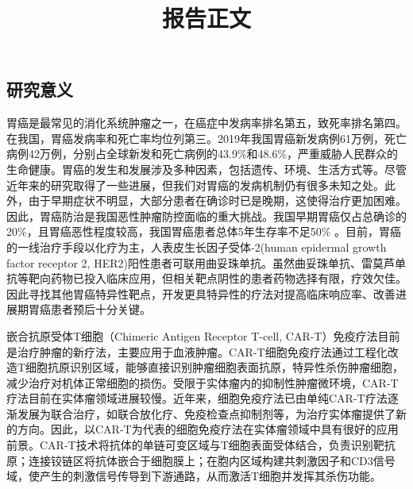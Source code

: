 \documentclass[12pt]{article}
\begin{document}

\title{报告正文}

\maketitle







\subsection{研究意义}


胃癌是最常见的消化系统肿瘤之一，在癌症中发病率排名第五，致死率排名第四。在我国，胃癌发病率和死亡率均位列第三\cite{1}。2019年我国胃癌新发病例61万例，死亡病例42万例，分别占全球新发和死亡病例的43.9\%和48.6\%\cite{2}，严重威胁人民群众的生命健康。胃癌的发生和发展涉及多种因素，包括遗传、环境、生活方式等。尽管近年来的研究取得了一些进展，但我们对胃癌的发病机制仍有很多未知之处。此外，由于早期症状不明显，大部分患者在确诊时已是晚期，这使得治疗更加困难。因此，胃癌防治是我国恶性肿瘤防控面临的重大挑战。我国早期胃癌仅占总确诊的20\%，且胃癌恶性程度较高，我国胃癌患者总体5年生存率不足50\% \cite{3}。目前，胃癌的一线治疗手段以化疗为主，人表皮生长因子受体-2(human epidermal growth factor receptor 2, HER2)阳性患者可联用曲妥珠单抗\cite{4}。虽然曲妥珠单抗、雷莫芦单抗等靶向药物已投入临床应用，但相关靶点阴性的患者药物选择有限，疗效欠佳。因此寻找其他胃癌特异性靶点，开发更具特异性的疗法对提高临床响应率、改善进展期胃癌患者预后十分关键。

嵌合抗原受体T细胞（Chimeric Antigen Receptor T-cell, CAR-T）免疫疗法目前是治疗肿瘤的新疗法，主要应用于血液肿瘤\cite{5}。CAR-T细胞免疫疗法通过工程化改造T细胞抗原识别区域，能够直接识别肿瘤细胞表面抗原，特异性杀伤肿瘤细胞，减少治疗对机体正常细胞的损伤。受限于实体瘤内的抑制性肿瘤微环境，CAR-T疗法目前在实体瘤领域进展较慢。近年来，细胞免疫疗法已由单纯CAR-T疗法逐渐发展为联合治疗，如联合放化疗、免疫检查点抑制剂等，为治疗实体瘤提供了新的方向。因此，以CAR-T为代表的细胞免疫疗法在实体瘤领域中具有很好的应用前景。CAR-T技术将抗体的单链可变区域与T细胞表面受体结合，负责识别靶抗原；连接铰链区将抗体嵌合于细胞膜上；在胞内区域构建共刺激因子和CD3信号域，使产生的刺激信号传导到下游通路，从而激活T细胞并发挥其杀伤功能\cite{6}。
\end{document}
